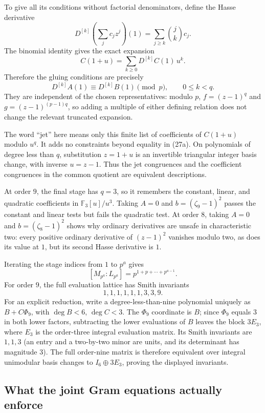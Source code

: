 \documentclass[
  11pt,
]{article}
\begin{document}
To give all its conditions without factorial denominators, define the
Hasse derivative \[
 D^{[k]}\!\left(\sum_jc_jz^j\right)(1)
       =\sum_{j\ge k}\binom jk c_j.
 \] The binomial identity gives the exact expansion \[
 C(1+u)=\sum_{k\ge0}D^{[k]}C(1)\,u^k.
 \] Therefore the gluing conditions are precisely \[
 D^{[k]}A(1)\equiv D^{[k]}B(1)\pmod p,
                 \qquad 0\le k<q.                       \tag{27b}
\] They are independent of the chosen representatives: modulo \(p\),
\(f=(z-1)^q\) and \(g=(z-1)^{(p-1)q}\), so adding a multiple of either
defining relation does not change the relevant truncated expansion.

The word ``jet'' here means only this finite list of coefficients of
\(C(1+u)\) modulo \(u^q\). It adds no constraints beyond equality in
(27a). On polynomials of degree less than \(q\), substitution \(z=1+u\)
is an invertible triangular integer basis change, with inverse
\(u=z-1\). Thus the jet congruences and the coefficient congruences in
the common quotient are equivalent descriptions.

At order \(9\), the final stage has \(q=3\), so it remembers the
constant, linear, and quadratic coefficients in \(\mathbb F_3[u]/u^3\).
Taking \(A=0\) and \(b=(\zeta_9-1)^2\) passes the constant and linear
tests but fails the quadratic test. At order \(8\), taking \(A=0\) and
\(b=(\zeta_8-1)^2\) shows why ordinary derivatives are unsafe in
characteristic two: every positive ordinary derivative of \((z-1)^2\)
vanishes modulo two, as does its value at \(1\), but its second Hasse
derivative is \(1\).

Iterating the stage indices from \(1\) to \(p^a\) gives \[
 [M_{p^a}:L_{p^a}]
       =p^{1+p+\cdots+p^{a-1}}.                          \tag{27c}
\] For order \(9\), the full evaluation lattice has Smith invariants \[
                    1,1,1,1,1,1,3,3,9.
 \] For an explicit reduction, write a degree-less-than-nine polynomial
uniquely as \(B+C\Phi_9\), with \(\deg B<6\), \(\deg C<3\). The
\(\Phi_9\) coordinate is \(B\); since \(\Phi_9\) equals \(3\) in both
lower factors, subtracting the lower evaluations of \(B\) leaves the
block \(3E_3\), where \(E_3\) is the order-three integral evaluation
matrix. Its Smith invariants are \(1,1,3\) (an entry and a two-by-two
minor are units, and its determinant has magnitude \(3\)). The full
order-nine matrix is therefore equivalent over integral unimodular basis
changes to \(I_6\oplus3E_3\), proving the displayed invariants.

\subsection{What the joint Gram equations actually
enforce}\label{what-the-joint-gram-equations-actually-enforce}
\end{document}
